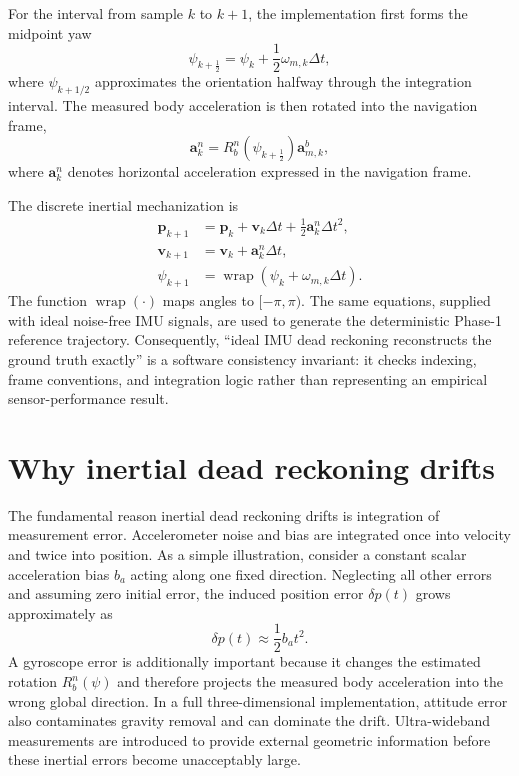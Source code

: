 For the interval from sample $k$ to $k+1$, the implementation first forms the midpoint yaw
\begin{equation}
\psi_{k+\frac12}=\psi_k+\frac12\omega_{m,k}\Delta t,
\end{equation}
where $\psi_{k+1/2}$ approximates the orientation halfway through the integration interval. The measured body acceleration is then rotated into the navigation frame,
\begin{equation}
\bm{a}_{k}^{n}=R_b^n\!\left(\psi_{k+\frac12}\right)\bm{a}_{m,k}^{b},
\end{equation}
where $\bm{a}_{k}^{n}$ denotes horizontal acceleration expressed in the navigation frame.

The discrete inertial mechanization is
\begin{align}
\bm{p}_{k+1} &= \bm{p}_k+\bm{v}_k\Delta t+\frac12\bm{a}_{k}^{n}\Delta t^2,\label{eq:mechanization_p}\\
\bm{v}_{k+1} &= \bm{v}_k+\bm{a}_{k}^{n}\Delta t,\label{eq:mechanization_v}\\
\psi_{k+1} &= \operatorname{wrap}\!\left(\psi_k+\omega_{m,k}\Delta t\right).\label{eq:mechanization_psi}
\end{align}
The function $\operatorname{wrap}(\cdot)$ maps angles to $[-\pi,\pi)$. The same equations, supplied with ideal noise-free IMU signals, are used to generate the deterministic Phase-1 reference trajectory. Consequently, ``ideal IMU dead reckoning reconstructs the ground truth exactly'' is a software consistency invariant: it checks indexing, frame conventions, and integration logic rather than representing an empirical sensor-performance result.

\section{Why inertial dead reckoning drifts}
The fundamental reason inertial dead reckoning drifts is integration of measurement error. Accelerometer noise and bias are integrated once into velocity and twice into position. As a simple illustration, consider a constant scalar acceleration bias $b_a$ acting along one fixed direction. Neglecting all other errors and assuming zero initial error, the induced position error $\delta p(t)$ grows approximately as
\begin{equation}
\delta p(t)\approx\frac12 b_a t^2.
\end{equation}
A gyroscope error is additionally important because it changes the estimated rotation $R_b^n(\psi)$ and therefore projects the measured body acceleration into the wrong global direction. In a full three-dimensional implementation, attitude error also contaminates gravity removal and can dominate the drift. Ultra-wideband measurements are introduced to provide external geometric information before these inertial errors become unacceptably large.

